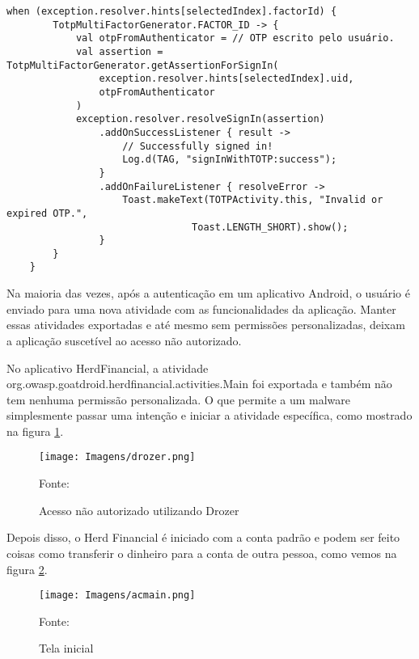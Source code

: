     \begin{scriptsize}
    \estiloJava
    \begin{lstlisting}[caption={Autenticação por TOTP Utilizando Firebase}, label=lst:javacode]
    when (exception.resolver.hints[selectedIndex].factorId) {
        TotpMultiFactorGenerator.FACTOR_ID -> {
            val otpFromAuthenticator = // OTP escrito pelo usuário.
            val assertion = TotpMultiFactorGenerator.getAssertionForSignIn(
                exception.resolver.hints[selectedIndex].uid,
                otpFromAuthenticator
            )
            exception.resolver.resolveSignIn(assertion)
                .addOnSuccessListener { result ->
                    // Successfully signed in!
                    Log.d(TAG, "signInWithTOTP:success");
                }
                .addOnFailureListener { resolveError ->
                    Toast.makeText(TOTPActivity.this, "Invalid or expired OTP.",
                                Toast.LENGTH_SHORT).show();
                }
        }
    }
    \end{lstlisting}
    \end{scriptsize}

    Na maioria das vezes, após a autenticação em um aplicativo Android, o usuário é enviado para uma nova atividade com as funcionalidades da aplicação. Manter essas atividades exportadas e até mesmo sem permissões personalizadas, deixam a aplicação suscetível ao acesso não autorizado. 
    
    No aplicativo HerdFinancial, a atividade org.owasp.goatdroid.herdfinancial.activities.Main foi exportada e também não tem nenhuma permissão personalizada. O que permite a um malware simplesmente passar uma intenção e iniciar a atividade específica, como mostrado na figura \ref{drozer}.

    \begin{figure}[H]
    \centering 
    \texttt{[image: Imagens/drozer.png]} 
    \caption{Acesso não autorizado utilizando Drozer}
    Fonte: 
    \label{drozer}
    \end{figure}

    Depois disso, o Herd Financial é iniciado com a conta padrão e podem ser feito coisas como transferir o dinheiro para a conta de outra pessoa, como vemos na figura \ref{main}. 

    \begin{figure}[H]
    \centering 
    \texttt{[image: Imagens/acmain.png]} 
    \caption{Tela inicial}
    Fonte: 
    \label{main}
    \end{figure}

